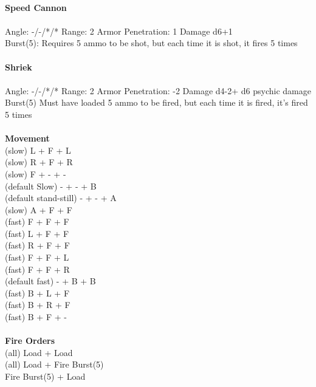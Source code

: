 \ \\
{\bf Speed Cannon } \\
\ \\
Angle: -/-/*/* Range: 2 Armor Penetration: 1 Damage d6+1 \\
\indent Burst(5): Requires 5 ammo to be shot, but each time it is shot, it fires 5 times \\



\ \\
{\bf Shriek } \\
\ \\
Angle: -/-/*/* Range: 2 Armor Penetration: -2 Damage d4-2+ d6 psychic damage \\
\indent Burst(5) Must have loaded 5 ammo to be fired, but each time it is fired, it's fired 5 times \\





\ \\ {\bf Movement } \\
(slow) L + F + L \\
(slow) R + F + R \\
(slow) F + - + - \\
(default Slow) - + - + B \\
(default stand-still) - + - + A \\
(slow) A + F + F \\
(fast) F + F + F \\
(fast) L + F + F \\
(fast) R + F + F \\
(fast) F + F + L \\
(fast) F + F + R \\
(default fast) - + B + B \\
(fast) B + L + F \\
(fast) B + R + F \\
(fast) B + F + - \\
\ \\ {\bf Fire Orders } \\
(all) Load + Load \\
(all) Load + Fire Burst(5) \\
Fire Burst(5) + Load \\



